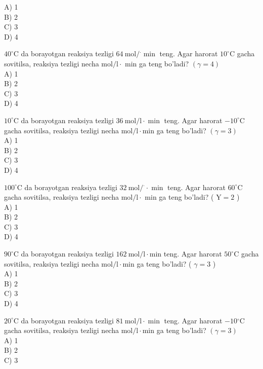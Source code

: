 A) 1\\
B) 2\\
C) 3\\
D) 4
  \item $40^{\circ} \mathrm{C}$ da borayotgan reaksiya tezligi $64 \mathrm{~mol} /{ }^{\cdot} \min$ teng. Agar harorat $10^{\circ} \mathrm{C}$ gacha sovitilsa, reaksiya tezligi necha $\mathrm{mol} / \mathrm{l} \cdot$ min ga teng bo'ladi? $(\gamma=4)$\\
A) 1\\
B) 2\\
C) 3\\
D) 4
  \item $10^{\circ} \mathrm{C}$ da borayotgan reaksiya tezligi $36 \mathrm{~mol} / \mathrm{l} \cdot \min$ teng. Agar harorat $-10^{\circ} \mathrm{C}$ gacha sovitilsa, reaksiya tezligi necha $\mathrm{mol} / \mathrm{l} \cdot \mathrm{min}$ ga teng bo'ladi? $(\gamma=3)$\\
A) 1\\
B) 2\\
C) 3\\
D) 4
  \item $100^{\circ} \mathrm{C}$ da borayotgan reaksiya tezligi $32 \mathrm{~mol} /{ }^{\cdot} \cdot \min$ teng. Agar harorat $60^{\circ} \mathrm{C}$ gacha sovitilsa, reaksiya tezligi necha $\mathrm{mol} / \mathrm{l} \cdot$ min ga teng bo'ladi? ( $\mathrm{Y}=2$ )\\
A) 1\\
B) 2\\
C) 3\\
D) 4
  \item $90^{\circ} \mathrm{C}$ da borayotgan reaksiya tezligi $162 \mathrm{~mol} / \mathrm{l} \cdot \mathrm{min}$ teng. Agar harorat $50^{\circ} \mathrm{C}$ gacha sovitilsa, reaksiya tezligi necha $\mathrm{mol} / \mathrm{l} \cdot \mathrm{min}$ ga teng bo'ladi? ( $\gamma=3$ )\\
A) 1\\
B) 2\\
C) 3\\
D) 4
  \item $20^{\circ} \mathrm{C}$ da borayotgan reaksiya tezligi $81 \mathrm{~mol} / \mathrm{l} \cdot \min$ teng. Agar harorat $-10{ }^{\circ} \mathrm{C}$ gacha sovitilsa, reaksiya tezligi necha $\mathrm{mol} / \mathrm{l} \cdot \mathrm{min}$ ga teng bo'ladi? $(\gamma=3)$\\
A) 1\\
B) 2\\
C) 3\\
